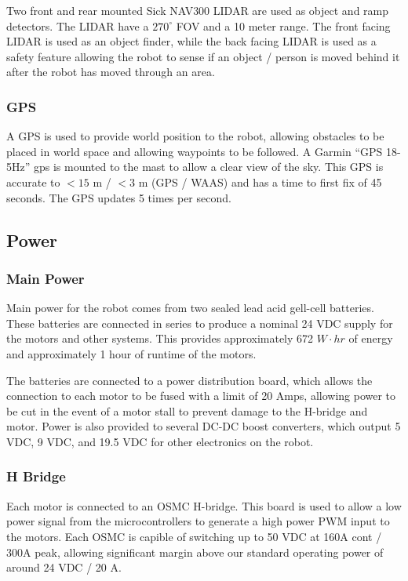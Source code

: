 Two front and rear mounted Sick NAV300 LIDAR are used as object and ramp detectors. The LIDAR have a $270^{\circ}$ FOV and a 10 meter range. The front facing LIDAR is used as an object finder, while the back facing LIDAR is used as a safety feature allowing the robot to sense if an object / person is moved behind it after the robot has moved through an area.

\subsubsection{GPS}

A GPS is used to provide world position to the robot, allowing obstacles to be placed in world space and allowing waypoints to be followed. A Garmin ``GPS 18-5Hz'' gps is mounted to the mast to allow a clear view of the sky. This GPS is accurate to $<15$ m / $<3$ m (GPS / WAAS) and has a time to first fix of 45 seconds. The GPS updates 5 times per second.

\subsection{Power}

\subsubsection{Main Power}

Main power for the robot comes from two sealed lead acid gell-cell batteries. These batteries are connected in series to produce a nominal 24 VDC supply for the motors and other systems. This provides approximately 672 $W \cdot hr$ of energy and approximately 1 hour of runtime of the motors.

The batteries are connected to a power distribution board, which allows the connection to each motor to be fused with a limit of 20 Amps, allowing power to be cut in the event of a motor stall to prevent damage to the H-bridge and motor. Power is also provided to several DC-DC boost converters, which output 5 VDC, 9 VDC, and 19.5 VDC for other electronics on the robot.

\subsubsection{H Bridge}

Each motor is connected to an OSMC H-bridge. This board is used to allow a low power signal from the microcontrollers to generate a high power PWM input to the motors. Each OSMC is capible of switching up to 50 VDC at 160A cont / 300A peak, allowing significant margin above our standard operating power of around 24 VDC / 20 A.


